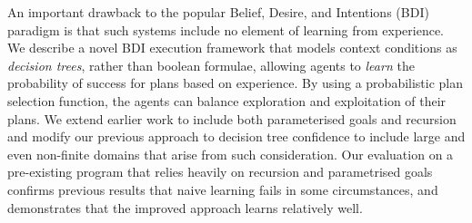 An important drawback to the popular Belief, Desire, and Intentions (BDI)
paradigm is that such systems include no element of learning from experience.
We describe a novel BDI execution framework that models
context conditions as \emph{decision trees}, rather than boolean
formulae, allowing
agents to \emph{learn} the probability of success for plans based on
experience. By using a probabilistic plan selection function, the
agents can balance exploration and exploitation of their plans.
We extend earlier work to include both parameterised goals and
recursion and modify our previous approach to decision tree
confidence to include large and even non-finite domains that arise
from such consideration.
Our evaluation on a pre-existing program that relies heavily
on recursion and parametrised goals confirms previous results
that naive learning fails in some circumstances, and
demonstrates that the improved approach learns relatively well.

